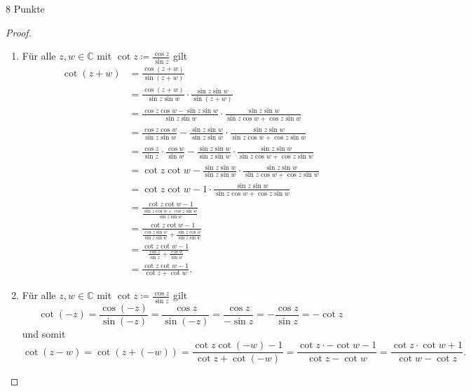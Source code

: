 \documentclass{../problemset}
\begin{document}
\begin{problem}{8 Punkte}
\begin{proof}
	\begin{enumerate}
		\item Für alle $z, w \in \mathbb{C}$ mit $\cot z \coloneqq \frac{\cos z}{\sin z}$ gilt
		      \begin{align*}
			      \cot (z + w) & = \frac{\cos (z + w)}{\sin (z + w)}                                                                                                                 \\
			                   & = \frac{\cos (z + w)}{\sin z \sin w} \cdot \frac{\sin z \sin w}{\sin (z + w)}                                                                       \\
			                   & = \frac{\cos z \cos w - \sin z \sin w}{\sin z \sin w} \cdot \frac{\sin z \sin w}{\sin z \cos w + \cos z \sin w}                                     \\
			                   & = \frac{\cos z \cos w}{\sin z \sin w} - \frac{\sin z \sin w}{\sin z \sin w} \cdot \frac{\sin z \sin w}{\sin z \cos w + \cos z \sin w}               \\
			                   & = \frac{\cos z}{\sin z} \cdot \frac{\cos w}{\sin w} - \frac{\sin z \sin w}{\sin z \sin w} \cdot \frac{\sin z \sin w}{\sin z \cos w + \cos z \sin w} \\
			                   & = \cot z \cot w - \frac{\sin z \sin w}{\sin z \sin w} \cdot \frac{\sin z \sin w}{\sin z \cos w + \cos z \sin w}                                     \\
			                   & = \cot z \cot w - 1 \cdot \frac{\sin z \sin w}{\sin z \cos w + \cos z \sin w}                                                                       \\
			                   & = \frac{\cot z \cot w - 1}{\frac{\sin z \cos w + \cos z \sin w}{\sin z \sin w}}                                                                     \\
			                   & = \frac{\cot z \cot w - 1}{\frac{\cos z \sin w}{\sin z \sin w} + \frac{\sin z \cos w}{\sin z \sin w}}                                               \\
			                   & = \frac{\cot z \cot w - 1}{\frac{\cos z }{\sin z} + \frac{\cos w}{\sin w}}                                                                          \\
			                   & = \frac{\cot z \cot w - 1}{\cot z + \cot w}.
		      \end{align*}

		\item Für alle $z, w \in \mathbb{C}$ mit $\cot z \coloneqq \frac{\cos z}{\sin z}$ gilt
		      \[
			      \cot (-z) = \frac{\cos (-z)}{\sin (-z)} = \frac{\cos z}{\sin (-z)} = \frac{\cos z}{ - \sin z} = - \frac{\cos z}{ \sin z} = - \cot z
		      \]
		      und somit
		      \[
			      \cot(z - w) = \cot(z + (-w)) = \frac{\cot z \cot (-w) - 1}{\cot z + \cot (-w)} = \frac{\cot z \cdot -\cot w - 1}{\cot z - \cot w} = \frac{\cot z \cdot \cot w + 1}{\cot w  - \cot z}.
		      \]


\end{enumerate}
\end{proof}
\end{problem}
\end{document}
